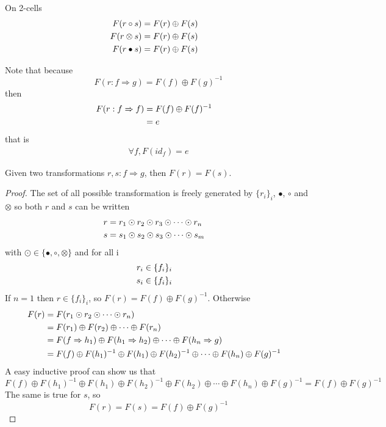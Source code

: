 \documentclass[a4paper]{article}
\begin{document}
On 2-cells
\begin{align}
F(r \circ s) &= F(r) \oplus F(s) \cr
F(r \otimes s) &= F(r) \oplus F(s) \cr
F(r \bullet s) &= F(r) \oplus F(s)
\end{align}

\begin{remark}
Note that because
\[
F(r: f \Rightarrow g) = F(f) \oplus F(g)^{-1}
\]
then
\begin{align}
F(r: f \Rightarrow f) &= F(f) \oplus F(f)^{-1} \cr
&= e
\end{align}
that is
\begin{align}
\forall f, F(id_f) = e
\end{align}
\end{remark}

\begin{proposition}
Given two transformations $r, s: f \Rightarrow g$, then $F(r) = F(s)$.

\begin{proof}
The set of all possible transformation is freely generated by $\{r_i\}_i$, $\bullet$, $\circ$ and $\otimes$ so both $r$ and $s$ can be written
\begin{align}
r &= r_1 \odot r_2 \odot r_3 \odot \cdots \odot r_n \cr
s &= s_1 \odot s_2 \odot s_3 \odot \cdots \odot s_m
\end{align}
with $\odot \in \{\bullet, \circ, \otimes\}$ and for all i
\begin{align}
r_i &\in \{f_i\}_i \cr
s_i &\in \{f_i\}_i
\end{align}
If $n = 1$ then $r \in \{f_i\}_i$, so $F(r) = F(f) \oplus F(g)^{-1}$.
Otherwise
\begin{align}
F(r) &= F(r_1 \odot r_2 \odot \cdots \odot r_n) \cr
&= F(r_1) \oplus F(r_2) \oplus \cdots \oplus F(r_n) \cr
&= F(f \Rightarrow h_1) \oplus F(h_1 \Rightarrow h_2) \oplus \cdots \oplus F(h_n \Rightarrow g) \cr
&= F(f) \oplus F(h_1)^{-1} \oplus F(h_1) \oplus F(h_2)^{-1} \oplus \cdots \oplus F(h_n) \oplus F(g)^{-1}
\end{align}
A easy inductive proof can show us that
\[
F(f) \oplus F(h_1)^{-1} \oplus F(h_1) \oplus F(h_2)^{-1} \oplus F(h_2) \oplus \cdots \oplus F(h_n) \oplus F(g)^{-1} = F(f) \oplus F(g)^{-1}
\]
The same is true for $s$, so
\[
F(r) = F(s) = F(f) \oplus F(g)^{-1}
\]
\end{proof}
\end{proposition}
\end{document}
